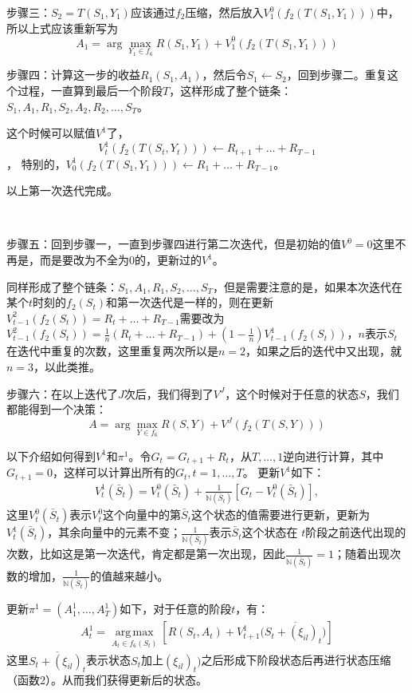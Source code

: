 \documentclass[a4paper,11pt]
{elsarticle}%
\begin{document}
步骤三：$S_2=T(S_1,Y_1)$应该通过$f_2$压缩，然后放入$V_1^0(f_2(T(S_1,Y_1)))$中，所以上式应该重新写为
$$
A_1=\arg\max\limits_{Y_1\in f_6}R(S_1,Y_1)+V_1^0(f_2(T(S_1,Y_1)))
$$

步骤四：计算这一步的收益$R_1(S_1,A_1)$，然后令$S_1\gets S_2$，回到步骤二。重复这个过程，一直算到最后一个阶段$T$，这样形成了整个链条：$S_1,A_1,R_1,S_2,A_2,R_2,\ldots,S_T$。

这个时候可以赋值$V^1$了，$$V^1_t(f_2(T(S_t,Y_t)))\gets R_{t+1}+\ldots+R_{T-1}$$，
特别的，$V^1_0(f_2(T(S_1,Y_1)))\gets R_{1}+\ldots+R_{T-1}$。

以上第一次迭代完成。

~

步骤五：回到步骤一，一直到步骤四进行第二次迭代，但是初始的值$V^0=0$这里不再是，而是要改为不全为0的，更新过的$V^1$。

同样形成了整个链条：$S_1,A_1,R_1,S_2,\ldots,S_T$，但是需要注意的是，如果本次迭代在某个$t$时刻的$f_2(S_t)$和第一次迭代是一样的，则在更新$V_{t-1}^2(f_2(S_t))=R_t+\ldots+R_{T-1}$需要改为$V_{t-1}^2(f_2(S_t))=\frac{1}{n}(R_t+\ldots+R_{T-1})+(1-\frac{1}{n})V_{t-1}^1(f_2(S_t))$，$n$表示$S_t$在迭代中重复的次数，这里重复两次所以是$n=2$，如果之后的迭代中又出现，就$n=3$，以此类推。

步骤六：在以上迭代了$J$次后，我们得到了$V^J$，这个时候对于任意的状态$S$，我们都能得到一个决策：
$$
A=\arg\max\limits_{Y\in f_6}R(S,Y)+V^J(f_2(T(S,Y)))
$$

以下介绍如何得到$V^1$和$\pi^1$。令$G_{t}=G_{t+1}+R_t$，从$T,\ldots,1$逆向进行计算，其中$G_{t+1}=0$，这样可以计算出所有的$G_t,t=1,\ldots,T$。
更新$V^1$如下：
\begin{align}\label{eq-updatev}
V_t^1(\bar{S}_t)=V_t^{0}(\bar{S}_t)+\frac{1}{\mathbb{N}(\bar{S}_t)}[G_t-V_t^{0}(\bar{S}_t)], 
\end{align}
这里$V_t^0(\bar{S}_t)$表示$V_t^0$这个向量中的第$\bar{S}_t$这个状态的值需要进行更新，更新为$V^1_t(\bar{S}_t)$，其余向量中的元素不变；$\frac{1}{\mathbb{N}(\bar{S}_t)}$表示$\bar{S}_t$这个状态在
$t$阶段之前迭代出现的次数，比如这是第一次迭代，肯定都是第一次出现，因此$\frac{1}{\mathbb{N}(\bar{S}_t)}=1$；随着出现次数的增加，$\frac{1}{\mathbb{N}(\bar{S}_t)}$的值越来越小。

更新$\pi^1=(A^1_1,\ldots,A^1_T)$如下，对于任意的阶段$t$，有：
\begin{align}\label{A}
A_t^1=\operatorname*{arg\,max}\limits_{A_t\in f_6(S_t)}[{R}({S}_t,{A}_t)+V^1_{t+1}(\overline{S_t+(\xi_{il})_t)}]
\end{align}
这里$\overline{S_t+(\xi_{il})_t}$表示状态$S_t$加上$(\xi_{il})_t)$之后形成下阶段状态后再进行状态压缩（函数2）。从而我们获得更新后的状态。
\end{document}
